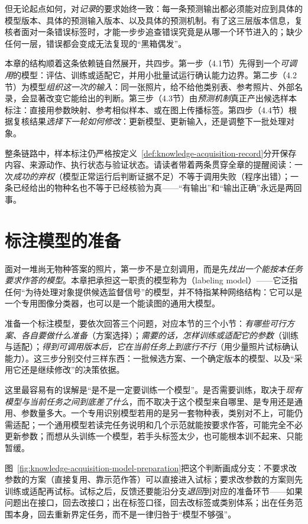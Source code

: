 但无论起点如何，对\emph{记录}的要求始终一致：每一条预测输出都必须能对应到具体的模型版本、具体的预测输入版本、以及具体的预测机制。有了这三层版本信息，复核者面对一条错误标签时，才能一步步追查错误究竟是从哪一个环节进入的；缺少任何一层，错误都会变成无法复现的“黑箱偶发”。

本章的结构顺着这条依赖链自然展开，共四步。第一步（4.1节）先得到一个\emph{可调用}的模型：评估、训练或适配它，并用小批量试运行确认能力边界。第二步（4.2节）为模型\emph{组织这一次的输入}：同一张照片，给不给他类别表、参考照片、外部名录，会显著改变它能给出的判断。第三步（4.3节）由\emph{预测机制}真正产出候选样本标注：直接用参数映射、参考相似样本、或在图上传播标签。第四步（4.4节）根据复核结果\emph{选择下一轮如何修改}：更新模型、更新输入，还是调整下一批处理对象。

整条链路中，样本标注仍严格按定义~\ref{def:knowledge-acquisition-record}分开保存内容、来源动作、执行状态与验证状态。请读者带着两条贯穿全章的提醒阅读：一次\emph{成功的弃权}（模型正常运行后判断证据不足）不等于调用失败（程序出错）；一条已经给出的物种名也不等于已经核验为真——“有输出”和“输出正确”永远是两回事。

\section{标注模型的准备}
\label{sec:knowledge-acquisition-model-preparation}

面对一堆尚无物种答案的照片，第一步不是立刻调用，而是先\emph{找出一个能按本任务要求作答的模型}。本章把承担这一职责的模型称为（labeling model）——它泛指任何“为待处理对象提供候选监督信号”的模型，并不特指某种网络结构：它可以是一个专用图像分类器，也可以是一个能读图的通用大模型。

准备一个标注模型，要依次回答三个问题，对应本节的三个小节：\emph{有哪些可行方案、各自要做什么准备}（方案选择）；\emph{需要的话，怎样训练或适配它的参数}（训练与适配）；\emph{得到可调用版本后，它在当前任务上到底行不行}（用少量照片试标确认能力）。这三步分别交付三样东西：一批候选方案、一个确定版本的模型、以及“采用它还是继续修改”的决策依据。

这里最容易有的误解是“是不是一定要训练一个模型”。是否需要训练，取决于\emph{现有模型与当前任务之间到底差了什么}，而不取决于这个模型来自哪里、是专用还是通用、参数量多大。一个专用识别模型若用的是另一套物种表，类别对不上，可能仍需适配；一个通用模型若读完任务说明和几个示范就能按要求作答，可能完全不必更新参数；而想从头训练一个模型，若手头标签太少，也可能根本训不起来、只能暂缓。

图~\ref{fig:knowledge-acquisition-model-preparation}把这个判断画成分支：不要求改参数的方案（直接复用、靠示范作答）可以直接进入试标；要求改参数的方案则先训练或适配再试标。试标之后，反馈还要能沿分支\emph{退回}到对应的准备环节——如果问题出在接口，回去改接口；出在标签口径，回去改标签或类别体系；出在任务范围本身，回去重新界定任务，而不是一律归咎于“模型不够强”。

